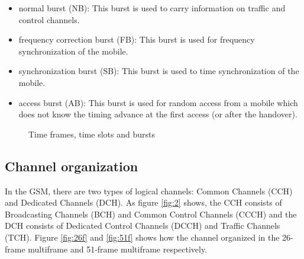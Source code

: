 \documentclass[a4paper,12pt,oneside]{article}
\begin{document}
\begin{itemize}
\item normal burst (NB): This burst is used to carry information on traffic and control channels.
\item frequency correction burst (FB): This burst is used for frequency synchronization of the mobile.
\item synchronization burst (SB): This burst is used to time synchronization of the mobile.
\item access burst (AB): This burst is used for random access from a mobile which does not know the timing advance at the first access (or after the handover).
\end{itemize}

\newpage

\begin{figure}[!h]

\caption{Time frames, time slots and bursts \label{fig:1} \cite{etsi199203}}
\end{figure}
\newpage

\subsection{Channel organization}
In the GSM, there are two types of logical channels: Common Channels (CCH) and Dedicated Channels (DCH). As figure \ref{fig:2} shows, the CCH consists of Broadcasting Channels (BCH) and Common Control Channels (CCCH) and the DCH consists of Dedicated Control Channels (DCCH) and Traffic Channels (TCH). Figure \ref{fig:26f} and \ref{fig:51f} shows how the channel organized in the 26-frame multiframe and 51-frame multiframe respectively.
\end{document}
